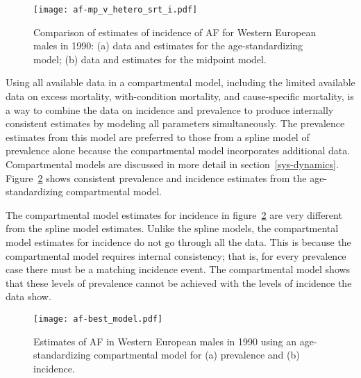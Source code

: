     \begin{figure}[h]
        \begin{center}
            \texttt{[image: af-mp\_v\_hetero\_srt\_i.pdf]}
            \caption{Comparison of estimates of incidence of AF for
              Western European males in 1990: (a) data and
              estimates for the age-standardizing model; (b) data and
              estimates for the midpoint model.}
            \label{fig:app-af srt i}
        \end{center}
    \end{figure}

Using all available data in a compartmental model, including the
limited available data on excess mortality, with-condition mortality,
and cause-specific mortality, is a way to combine the data on
incidence and prevalence to produce internally consistent estimates by
modeling all parameters simultaneously.  The prevalence estimates
from this model are preferred to those from a spline model of prevalence alone
because the compartmental model incorporates additional data.  Compartmental models are
discussed in more detail in
section~\ref{sys-dynamics}.  Figure~\ref{fig:app-af age-stand} shows
consistent prevalence and incidence estimates from the
age-standardizing compartmental model.

The compartmental model estimates for incidence in
figure~\ref{fig:app-af age-stand} are very different from the spline
model estimates.  Unlike the spline models, the compartmental model
estimates for incidence do not go through all the data.  This is
because the compartmental model requires internal consistency;
that is, for every prevalence case there must be a matching incidence event.
The compartmental model shows that these levels of prevalence cannot
be achieved with the levels of incidence the data show.

    \begin{figure}[h]
        \begin{center}
            \texttt{[image: af-best\_model.pdf]}
            \caption[Estimates of AF in Western European males in 1990
              using an age-standardizing compartmental
              model]{Estimates of AF in Western European males in 1990
              using an age-standardizing compartmental model for (a)
              prevalence and (b) incidence.}
            \label{fig:app-af age-stand}
        \end{center}
    \end{figure}

